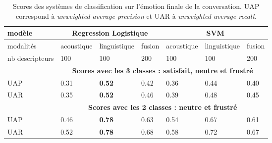 \begin{table}[h]
  \centering
  \begin{tabular}{|l| l l l | l l l|}
    \hline
    modèle    &\multicolumn{3}{c|}{Regression Logistique} &\multicolumn{3}{c|}{SVM} \\
    \hline
    modalités    &acoustique  &linguistique  &fusion  &acoustique  &linguistique  &fusion\\
    nb descripteurs         & 100&100&200 & 100&100 &200\\
    \hline
    &\multicolumn{6}{c|}{\textbf{Scores avec les 3 classes : satisfait, neutre et frustré}}\\
    \hline
    UAP           &0.31  &\textbf{0.52}  & 0.42 &0.36 &0.44  &0.40 \\
    UAR              &0.35  &\textbf{0.52}  &0.46 &0.39  &0.48  & 0.45\\
    \hline
    &\multicolumn{6}{c|}{\textbf{Scores avec les 2 classes : neutre et frustré}}\\
    \hline
    UAP           &0.46 &\textbf{0.78} &0.63 &0.54 &0.67 &0.61 \\
    UAR              &0.52 &\textbf{0.78} &0.68 &0.58 &0.72 &0.67 \\
    \hline
  \end{tabular}
\caption{Scores des systèmes de classification sur l'émotion finale de la conversation. UAP correspond à \textit{unweighted average precision} et UAR à \textit{unweighted average recall}.} %
\label{tab:resultClassifDiscreteOld}
\end{table}
